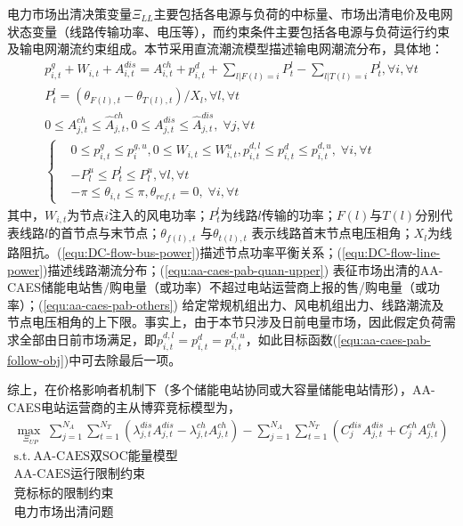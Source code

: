 电力市场出清决策变量${\Xi _{LL}}$主要包括各电源与负荷的中标量、市场出清电价及电网状态变量（线路传输功率、电压等），而约束条件主要包括各电源与负荷运行约束及输电网潮流约束组成。本节采用直流潮流模型描述输电网潮流分布\cite{MATPOWER}，具体地：
\begin{subequations}
\label{equ:DC-flow}
\begin{gather}
p_{i,t}^g + W_{i,t}^{} + A_{i,t}^{dis} = A_{i,t}^{ch} + p_{i,t}^d + \sum\limits_{l|F(l) = i} {P_t^l}  - \sum\limits_{l|T(l) = i} {P_t^l} ,\forall i,\forall t \label{equ:DC-flow-bus-power}\\
P_t^l = ({{\theta _{F(l),t}} - {\theta _{T(l),t}}})/{X_l},\forall l,\forall t \label{equ:DC-flow-line-power}\\
0 \le A_{j,t}^{ch} \le \hat A_{j,t}^{ch}, 0 \le A_{j,t}^{dis} \le \hat A_{j,t}^{dis},\;\forall j,\forall t \label{equ:aa-caes-pab-quan-upper}\\
\left\{\begin{aligned}
&0 \le p_{i,t}^g \le p_i^{g,u},0 \le W_{i,t}^{} \le W_{i,t}^u, p_{i,t}^{d,l} \le p_{i,t}^d \le p_{i,t}^{d,u},\;\forall i,\forall t\\
& - P_l^u \le P_t^l \le P_l^u,\forall l,\forall t\\
&  - \pi  \le {\theta _{i,t}} \le \pi ,{\theta _{ref,t}} = 0,\;\forall i,\forall t
\end{aligned}\right.\label{equ:aa-caes-pab-others}
\end{gather}
\end{subequations}
其中，$W_{i,t}$为节点$i$注入的风电功率；$P_t^l$为线路$l$传输的功率；$F(l)$与$T(l)$分别代表线路$l$的首节点与末节点；$\theta _{f(l),t}$ 与$\theta _{t(l),t}$ 表示线路首末节点电压相角；$X_l$为线路阻抗。(\ref{equ:DC-flow-bus-power})描述节点功率平衡关系；(\ref{equ:DC-flow-line-power})描述线路潮流分布；(\ref{equ:aa-caes-pab-quan-upper}) 表征市场出清的AA-CAES储能电站售/购电量（或功率）不超过电站运营商上报的售/购电量（或功率）；(\ref{equ:aa-caes-pab-others}) 给定常规机组出力、风电机组出力、线路潮流及节点电压相角的上下限。事实上，由于本节只涉及日前电量市场，因此假定负荷需求全部由日前市场满足，即$ p_{i,t}^{d,l}= p_{i,t}^d = p_{i,t}^{d,u}$，如此目标函数(\ref{equ:aa-caes-pab-follow-obj})中可去除最后一项。

综上，在价格影响者机制下（多个储能电站协同或大容量储能电站情形），AA-CAES电站运营商的主从博弈竞标模型为，
\begin{subequations}
\label{equ:bid-model-price-marker}
\begin{gather}
\mathop {\max \;}\limits_{{\Xi _{UP}}} \sum\limits_{j = 1}^{{N_A}} {\sum\limits_{t = 1}^{{N_T}} {({\lambda _{j,t}^{dis}A_{j,t}^{dis} - \lambda _{j,t}^{ch}A_{j,t}^{ch}})} } - \sum\limits_{j = 1}^{{N_A}} {\sum\limits_{t = 1}^{{N_T}} {({C_j^{dis}A_{j,t}^{dis} + C_j^{ch}A_{j,t}^{ch}})}}\label{equ:bid-model-price-marker-obj}\\
\mbox{s.t.}~
\mbox{AA-CAES双SOC能量模型}\\
\mbox{AA-CAES运行限制约束}\\
\mbox{竞标标的限制约束}\\
\mbox{电力市场出清问题} 
\end{gather}
\end{subequations}

